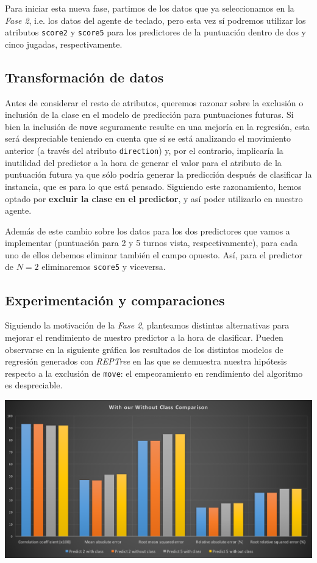 \documentclass[12pt]{article}
\begin{document}
Para iniciar esta nueva fase, partimos de los datos que ya seleccionamos en la \emph{Fase 2}, i.e. los datos del agente de teclado, pero esta vez sí podremos utilizar los atributos \texttt{score2} y \texttt{score5} para los predictores de la puntuación dentro de dos y cinco jugadas, respectivamente.

\subsection{Transformación de datos}

Antes de considerar el resto de atributos, queremos razonar sobre la exclusión o inclusión de la clase en el modelo de predicción para puntuaciones futuras. Si bien la inclusión de \texttt{move} seguramente resulte en una mejoría en la regresión, esta será despreciable teniendo en cuenta que sí se está analizando el movimiento anterior (a través del atributo \texttt{direction}) y, por el contrario, implicaría la inutilidad del predictor a la hora de generar el valor para el atributo de la puntuación futura ya que sólo podría generar la predicción después de clasificar la instancia, que es para lo que está pensado. Siguiendo este razonamiento, hemos optado por \textbf{excluir la clase en el predictor}, y así poder utilizarlo en nuestro agente.

Además de este cambio sobre los datos para los dos predictores que vamos a implementar (puntuación para 2 y 5 turnos vista, respectivamente), para cada uno de ellos debemos eliminar también el campo opuesto. Así, para el predictor de $N=2$ eliminaremos \texttt{score5} y viceversa.

\subsection{Experimentación y comparaciones}

Siguiendo la motivación de la \emph{Fase 2}, planteamos distintas alternativas para mejorar el rendimiento de nuestro predictor a la hora de clasificar. Pueden observarse en la siguiente gráfica los resultados de los distintos modelos de regresión generados con \emph{REPTree} en las que se demuestra nuestra hipótesis respecto a la exclusión de \texttt{move}: el empeoramiento en rendimiento del algoritmo es despreciable.

\vspace{0.3cm}

\noindent \includegraphics[width=\textwidth]{class_or_no}
\end{document}
